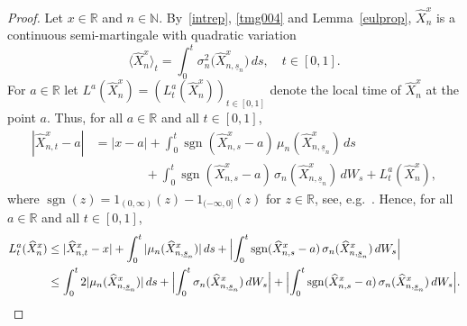 \documentclass[11pt]{amsart}
\newcommand{\R}{{\mathbb R}}
\newcommand{\N}{{\mathbb N}}
\newcommand{\eul}{{\widehat X}}
\newcommand{\usn}{\underline {s}_n}
\newcommand{\sgn}{\operatorname{sgn}}
\theoremstyle{plain}
\theoremstyle{definition}
\begin{document}
\begin{proof}
Let  $x\in\R$ and $n\in\N$.
By~\eqref{intrep},
\eqref{tmg004}
and Lemma~\ref{eulprop},  $\eul_n^x$ is a continuous semi-martingale with quadratic variation
\begin{equation}\label{qv}
\langle \eul_{n}^x\rangle_t
      =\int_0^t \sigma_n^2\bigl(\eul_{n,\usn}^x\bigr)\, ds,\quad t\in[0,1].
\end{equation}
For $a\in\R$ let $L^a(\eul_n^x) = (L^a_t(\eul_n^x))_{t\in[0,1]}$ denote the local time
of $\eul_{n}^x$ at the point $a$.
Thus,
for all $a\in\R$ and
 all $t\in[0,1]$,
\begin{align*}
|\eul_{n,t}^x-a| & = |x-a| + \int_0^t \sgn(\eul_{n,s}^x-a)\, \mu_n (\eul_{n,\usn}^x)\, ds\\
& \qquad\qquad  + \int_0^t \sgn(\eul_{n,s}^x-a)\, \sigma_n (\eul_{n,\usn}^x)\, dW_s + L^a_t(\eul_n^x),
\end{align*}
where $\sgn(z) = 1_{(0,\infty)}(z) - 1_{(-\infty,0]}(z)$ for $z\in\R$,
see, e.g.~\cite[Chap. VI]{RevuzYor2005}.
Hence,
for all $a\in\R$ and
 all $t\in[0,1]$,
 \begin{equation}\label{tmgx1}
\begin{aligned}
L^a_t(\eul_n^x) & \le |\eul^x_{n,t}-x| + \int_0^t |\mu_n (\eul_{n,\usn}^x)|\, ds + \Bigl|\int_0^t \sgn(\eul_{n,s}^x-a)\, \sigma_n (\eul_{n,\usn}^x)\, dW_s\Bigr|\\
& \le  \int_0^t 2 |\mu_n (\eul_{n,\usn}^x)|\, ds + \Bigl|\int_0^t\sigma_n (\eul_{n,\usn}^x)\, dW_s\Bigr|+ \Bigl|\int_0^t \sgn(\eul_{n,s}^x-a)\, \sigma_n (\eul_{n,\usn}^x)\, dW_s\Bigr|.
\end{aligned}
\end{equation}


\end{proof}
\end{document}
